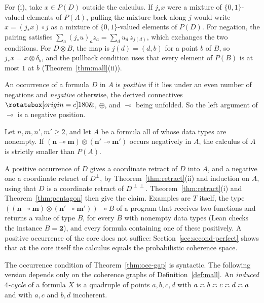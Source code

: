 \noindent
For (i), take $x \in P(D)$ outside the calculus. If $j_{*}x$ were a
mixture of $\{0,1\}$-valued elements of $P(A)$, pulling the mixture back
along $j$ would write $x = (j_{*}x) \circ j$ as a mixture of
$\{0,1\}$-valued elements of $P(D)$. For negation, the pairing satisfies
$\sum_a (j_{*}u)_a z_a = \sum_d u_d\, z_{j(d)}$, which exchanges the two
conditions. For $D \otimes B$, the map is $j(d) = (d, b)$ for a point $b$
of $B$, so $j_{*}x = x \otimes \delta_b$, and the pullback condition uses
that every element of $P(B)$ is at most $1$ at $b$
(Theorem~\ref{thm:mall}(ii)).

An occurrence of a formula $D$ in $A$ is \emph{positive} if it lies under
an even number of negations and \emph{negative} otherwise, the derived
connectives $\parr$, $\oplus$, and $\multimap$ being unfolded. So the left
argument of $\multimap$ is a negative position.

\begin{theorem}
\label{thm:occ-gap}
Let $n, m, n', m' \ge 2$, and let $A$ be a formula all of whose data types
are nonempty. If $(\mathbf{n} \multimap \mathbf{m}) \otimes
(\mathbf{n'} \multimap \mathbf{m'})$ occurs negatively in $A$, the
calculus of $A$ is strictly smaller than $P(A)$.
\end{theorem}

\noindent
A positive occurrence of $D$ gives a coordinate retract of $D$ into $A$,
and a negative one a coordinate retract of $D^{\perp}$, by
Theorem~\ref{thm:retract}(ii) and induction on $A$, using that $D$ is a
coordinate retract of $D^{\perp\perp}$. Theorem~\ref{thm:retract}(i) and
Theorem~\ref{thm:pentagon} then give the claim. Examples are $T$ itself,
the type $((\mathbf{n} \multimap \mathbf{m}) \otimes (\mathbf{n'}
\multimap \mathbf{m'})) \multimap B$ of a program that receives two
functions and returns a value of type $B$, for every $B$ with nonempty data
types (Lean checks the instance $B = \mathbf{2}$), and every formula
containing one of these positively. A
positive occurrence of the core does not suffice:
Section~\ref{sec:second-perfect} shows that at the core itself the
calculus equals the probabilistic coherence space.

The occurrence condition of Theorem~\ref{thm:occ-gap} is syntactic. The
following version depends only on
the coherence graphs of Definition~\ref{def:mall}. An \emph{induced $4$-cycle} of a formula $X$ is a
quadruple of points $a, b, c, d$ with $a \mathrel{\asymp} b \mathrel{\asymp} c \mathrel{\asymp} d \mathrel{\asymp} a$
and with $a, c$ and $b, d$ incoherent.

